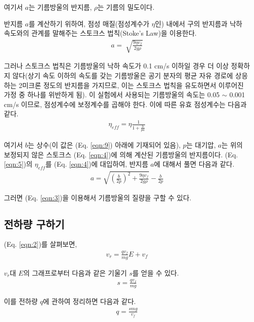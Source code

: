 \documentclass[a4paper, 10pt, nanum]{CSUniSchoolLabReport}
\begin{document}
	여기서 $a$는 기름방울의 반지름, $\rho$는 기름의 밀도이다.

	반지름 $a$를 계산하기 위하여, 점성 매질(점성계수가 $\eta$인) 내에서 구의 반지름과 낙하 속도와의 관계를 말해주는 스토크스 법칙(Stoke's Law)을 이용한다. 
	\begin{align}
		\label{eqn:4}
		a = \sqrt[]{\frac{9\eta v_f}{2g\rho}}
	\end{align}

	그러나 스토크스 법칙은 기름방울의 낙하 속도가 0.1 cm/s 이하일 경우 더 이상 정확하지 않다(상기 속도 이하의 속도를 갖는 기름방울은 공기 분자의 평균 자유 경로에 상응하는 2미크론 정도의 반지름을 가지므로, 이는 스토크스 법칙을 유도하면서 이루어진 가정 중 하나를 위반하게 됨). 이 실험에서 사용되는 기름방울의 속도는 0.05 $\sim$ 0.001 cm/s 이므로, 점성계수에 보정계수를 곱해야 한다. 이에 따른 유효 점성계수는 다음과 같다.
	\begin{align}
		\label{eqn:5}
		\eta_{eff} = \eta \frac{1}{1 + \frac{b}{pa}}
	\end{align}

	여기서 $b$는 상수(이 값은 (Eq. \ref{eqn:9}) 아래에 기재되어 있음), $p$는 대기압, $a$는 위의 보정되지 않은 스토크스 (Eq. \ref{eqn:4})에 의해 계산된 기름방울의 반지름이다. 
	(Eq. \ref{eqn:5})의 $\eta_{eff}$를 (Eq. \ref{eqn:4})에 대입하여, 반지름 $a$에 대해서 풀면 다음과 같다.
	\begin{align}
		\label{eqn:6}
		a = \sqrt{\left(\frac{b}{2p}\right)^2 + \frac{9\eta v_f}{2g\rho}} - \frac{b}{2p}
	\end{align}

	그러면 (Eq. \ref{eqn:3})을 이용해서 기름방울의 질량을 구할 수 있다.

\subsection{전하량 구하기}

	(Eq. \ref{eqn:2})를 살펴보면,
	\begin{align*}
		v_r = \frac{qv_f}{mg} E + v_f
	\end{align*}

	$v_r$대 $E$의 그래프로부터 다음과 같은 기울기 $s$를 얻을 수 있다.
	\begin{align}
		\label{eqn:7}
		s = \frac{qv_f}{mg}
	\end{align}

	이를 전하량 $q$에 관하여 정리하면 다음과 같다.
	\begin{align}
		\label{eqn:8}
		q = \frac{smg}{v_f}
	\end{align}
\end{document}
